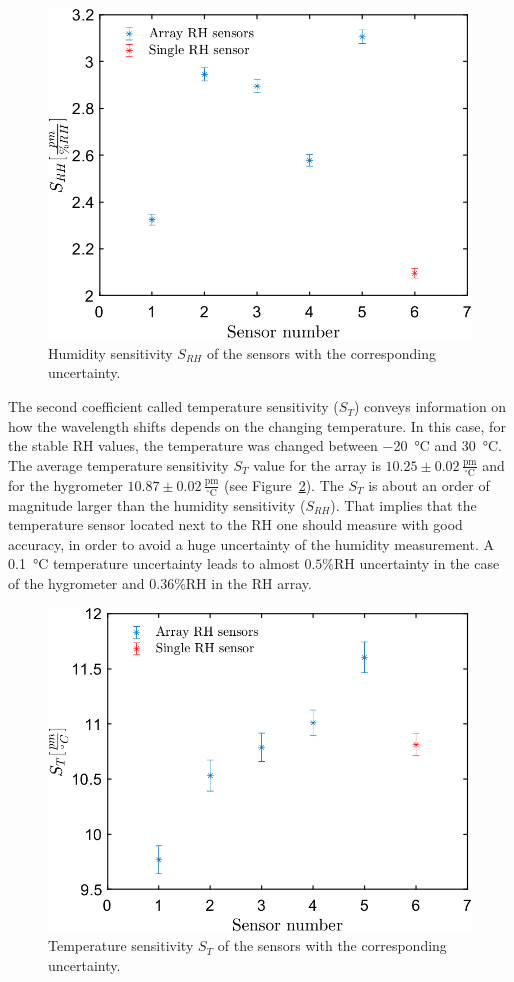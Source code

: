 \begin{figure}[!h]
\centering
\includegraphics[width=0.57\columnwidth]{Chapter5/images/comp1.png}
\caption{Humidity sensitivity $S_{RH}$ of the sensors with the corresponding uncertainty.}
\label{fig_calibration}
\end{figure}
\newpage
The second coefficient called temperature sensitivity ($S_{T}$) conveys information on how the wavelength shifts depends on the changing temperature. In this case, for the stable \gls{RH} values, the temperature was changed between \SI{-20}{\celsius} and \SI{30}{\celsius}. The average temperature sensitivity $S_{T}$ value for the array is $10.25\pm0.02\,\mathrm{\frac{pm}{^{\circ}C}}$ and for the hygrometer $10.87\pm 0.02\,\mathrm{\frac{pm}{^{\circ}C}}$ (see Figure~\ref{fig_calibration1}). The $S_{T}$ is about an order of magnitude larger than the humidity sensitivity ($S_{RH}$). That implies that the temperature sensor located next to the \gls{RH} one should measure with good accuracy, in order to avoid a huge uncertainty of the humidity measurement. A \SI{0.1}{\celsius} temperature uncertainty leads to almost $0.5$\%RH uncertainty in the case of the hygrometer and $0.36$\%RH in the \gls{RH} array. 

\begin{figure}[!h]
\centering
\includegraphics[width=0.57\columnwidth]{Chapter5/images/comp.png}
\caption{Temperature sensitivity $S_{T}$ of the sensors with the corresponding uncertainty.}
\label{fig_calibration1}
\end{figure}

